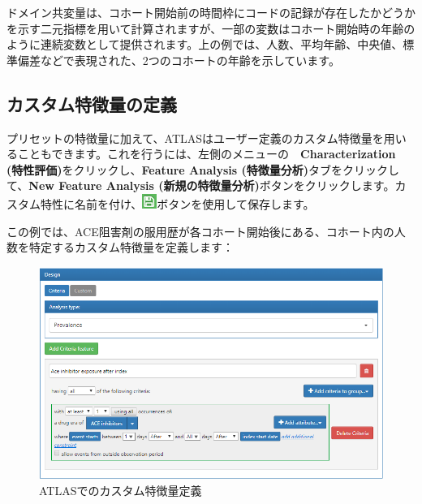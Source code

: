 \documentclass[
  11pt]{book}
\theoremstyle{definition}
\theoremstyle{definition}
\theoremstyle{definition}
\theoremstyle{definition}
\theoremstyle{remark}
\begin{document}
ドメイン共変量は、コホート開始前の時間枠にコードの記録が存在したかどうかを示す二元指標を用いて計算されますが、一部の変数はコホート開始時の年齢のように連続変数として提供されます。上の例では、人数、平均年齢、中央値、標準偏差などで表現された、2つのコホートの年齢を示しています。

\subsection{カスタム特徴量の定義}\label{ux30abux30b9ux30bfux30e0ux7279ux5fb4ux91cfux306eux5b9aux7fa9}

プリセットの特徴量に加えて、ATLASはユーザー定義のカスタム特徴量を用いることもできます。これを行うには、左側のメニューの　\textbf{Characterization (特性評価)}をクリックし、\textbf{Feature Analysis (特徴量分析)}タブをクリックして、\textbf{New Feature Analysis (新規の特徴量分析)}ボタンをクリックします。カスタム特性に名前を付け、\includegraphics{images/PopulationLevelEstimation/save.png}ボタンを使用して保存します。

この例では、ACE阻害剤の服用歴が各コホート開始後にある、コホート内の人数を特定するカスタム特徴量を定義します：

\begin{figure}

{\centering \includegraphics[width=1\linewidth]{images/Characterization/atlasCharacterizationCustomFeature} 

}

\caption{ATLASでのカスタム特徴量定義}\label{fig:atlasCharacterizationCustomFeature}
\end{figure}
\end{document}
